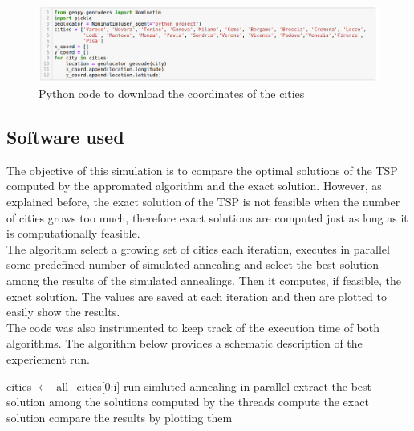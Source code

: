 \documentclass{article}
\begin{document}
\begin{figure}[H]
\includegraphics[scale=0.42]{download_dataset.png} 
\centering
\caption{Python code to download the coordinates of the cities}
\end{figure}

\subsection{Software used}
The objective of this simulation is to compare the optimal solutions of the TSP computed by the appromated algorithm and the exact solution.
However, as explained before, the exact solution of the TSP is not feasible when the number of cities grows too much, therefore exact solutions are computed just as long as it is computationally feasible. \\
The algorithm select a growing set of cities each iteration, executes in parallel some predefined number of simulated annealing and select the best solution among the results of the simulated annealings. Then it computes, if feasible, the exact solution. The values are saved at each iteration and then are plotted to easily show the results.\\
The code was also instrumented to keep track of the execution time of both algorithms.
The algorithm  below provides a schematic description of the experiement run. 
\begin{algorithm}[H]
    \begin{algorithmic}[1]
       	\State  cities $\leftarrow$ all\_cities[0:i]
       		\State run simluted annealing in parallel
       	\EndFor 
       	\State extract the best solution among the solutions computed by the threads
       		\State compute the exact solution
       	\EndIf
       	\State compare the results by plotting them
       \EndFor
       \EndFunction
\end{algorithmic}
\end{algorithm}
\end{document}
